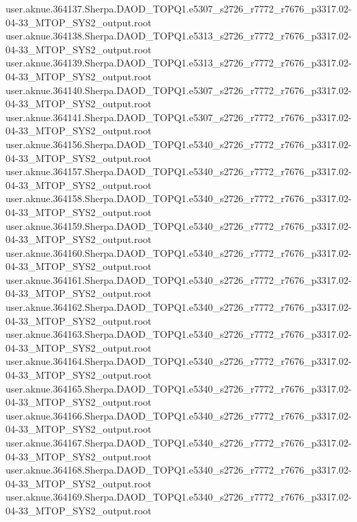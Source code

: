 {user.aknue.364137.Sherpa.DAOD_TOPQ1.e5307_s2726_r7772_r7676_p3317.02-04-33_MTOP_SYS2_output.root\\
user.aknue.364138.Sherpa.DAOD_TOPQ1.e5313_s2726_r7772_r7676_p3317.02-04-33_MTOP_SYS2_output.root\\
user.aknue.364139.Sherpa.DAOD_TOPQ1.e5313_s2726_r7772_r7676_p3317.02-04-33_MTOP_SYS2_output.root\\
user.aknue.364140.Sherpa.DAOD_TOPQ1.e5307_s2726_r7772_r7676_p3317.02-04-33_MTOP_SYS2_output.root\\
user.aknue.364141.Sherpa.DAOD_TOPQ1.e5307_s2726_r7772_r7676_p3317.02-04-33_MTOP_SYS2_output.root\\
user.aknue.364156.Sherpa.DAOD_TOPQ1.e5340_s2726_r7772_r7676_p3317.02-04-33_MTOP_SYS2_output.root\\
user.aknue.364157.Sherpa.DAOD_TOPQ1.e5340_s2726_r7772_r7676_p3317.02-04-33_MTOP_SYS2_output.root\\
user.aknue.364158.Sherpa.DAOD_TOPQ1.e5340_s2726_r7772_r7676_p3317.02-04-33_MTOP_SYS2_output.root\\
user.aknue.364159.Sherpa.DAOD_TOPQ1.e5340_s2726_r7772_r7676_p3317.02-04-33_MTOP_SYS2_output.root\\
user.aknue.364160.Sherpa.DAOD_TOPQ1.e5340_s2726_r7772_r7676_p3317.02-04-33_MTOP_SYS2_output.root\\
user.aknue.364161.Sherpa.DAOD_TOPQ1.e5340_s2726_r7772_r7676_p3317.02-04-33_MTOP_SYS2_output.root\\
user.aknue.364162.Sherpa.DAOD_TOPQ1.e5340_s2726_r7772_r7676_p3317.02-04-33_MTOP_SYS2_output.root\\
user.aknue.364163.Sherpa.DAOD_TOPQ1.e5340_s2726_r7772_r7676_p3317.02-04-33_MTOP_SYS2_output.root\\
user.aknue.364164.Sherpa.DAOD_TOPQ1.e5340_s2726_r7772_r7676_p3317.02-04-33_MTOP_SYS2_output.root\\
user.aknue.364165.Sherpa.DAOD_TOPQ1.e5340_s2726_r7772_r7676_p3317.02-04-33_MTOP_SYS2_output.root\\
user.aknue.364166.Sherpa.DAOD_TOPQ1.e5340_s2726_r7772_r7676_p3317.02-04-33_MTOP_SYS2_output.root\\
user.aknue.364167.Sherpa.DAOD_TOPQ1.e5340_s2726_r7772_r7676_p3317.02-04-33_MTOP_SYS2_output.root\\
user.aknue.364168.Sherpa.DAOD_TOPQ1.e5340_s2726_r7772_r7676_p3317.02-04-33_MTOP_SYS2_output.root\\
user.aknue.364169.Sherpa.DAOD_TOPQ1.e5340_s2726_r7772_r7676_p3317.02-04-33_MTOP_SYS2_output.root\\
}

